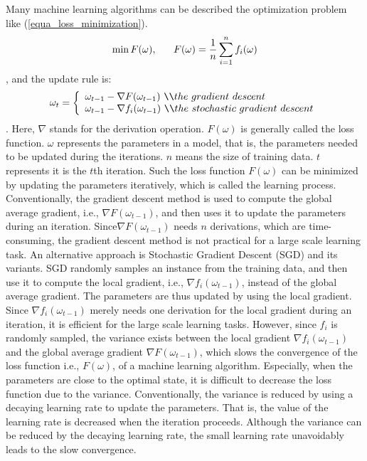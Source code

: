 \documentclass[10pt,journal,finalsubmission,compsoc]{IEEEtran}
\begin{document}
Many machine learning algorithms can be described the optimization problem like (\ref{equa_loss_minimization}).
\begin{equation}
\label{equa_loss_minimization}
\min F(\omega),~~~~~F(\omega)=\frac{1}{n}\sum\limits_{i=1}^n f_i(\omega)\\
\end{equation}, and the update rule is:
\begin{equation}
\omega_t=\left\{ \begin{array}{ll}
\omega_{t-1}-\nabla F(\omega_{t-1})$ \verb|\\|$the ~ gradient ~descent\\
\omega_{t-1}-\nabla f_i(\omega_{t-1})$ \verb|\\|$the ~stochastic ~gradient~ descent\\
\end{array} \right.
\end{equation}. Here, $\nabla$ stands for the derivation operation. $F(\omega)$ is generally called the loss function. $\omega$ represents the parameters in a model, that is, the parameters needed to be updated during the iterations. $n$ means the size of training data. $t$ represents it is the $t$th iteration.  Such the loss function $F(\omega)$ can be minimized by updating the parameters iteratively, which is called the learning process. Conventionally, the gradient descent method is used to compute the global average gradient, i.e., $\nabla F(\omega_{t-1})$, and then uses it to update the parameters during an iteration. Since$\nabla F(\omega_{t-1})$ needs $n$ derivations, which are time-consuming, the gradient descent method is not practical for a large scale learning task.  An alternative approach  is Stochastic  Gradient Descent (SGD) and its variants. SGD randomly samples an instance from the training data, and then use it to compute the local gradient, i.e., $\nabla f_i(\omega_{t-1})$, instead of the global average gradient.   The parameters are thus updated by using the local gradient. Since $\nabla f_i(\omega_{t-1})$ merely needs one derivation for the local gradient during an iteration,  it is efficient for the large scale learning tasks.  However, since $f_i$ is randomly sampled, the variance exists between the local gradient $\nabla f_i(\omega_{t-1})$ and the global average gradient $\nabla F(\omega_{t-1})$, which slows the convergence of the loss function i.e., $F(\omega)$, of a machine learning algorithm.  Especially, when the parameters are close to the optimal state, it is difficult to decrease the loss function due to the variance. Conventionally, the variance is reduced by using a decaying learning rate to update the parameters. That is,  the value of the learning rate is decreased when the iteration proceeds. Although the variance can be reduced by the decaying learning rate, the small learning rate unavoidably  leads to the slow convergence.  
\end{document}
